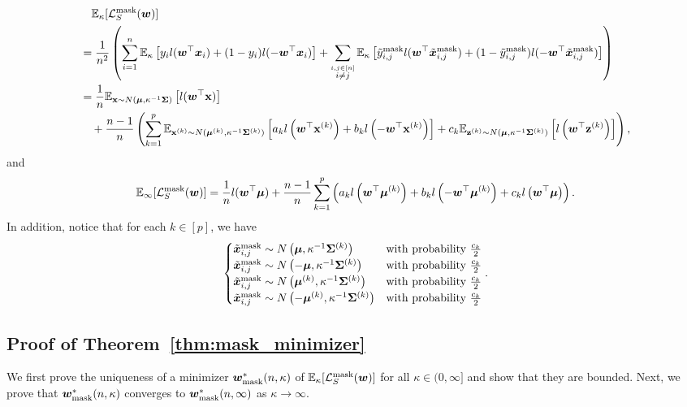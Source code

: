 \begin{align}\label{eqn:mask}
    &\quad \mathbb{E}_\kappa [\lossmask(\vw)]\nonumber \\
    &= \frac{1}{n^2} \left( \sum_{i=1}^n \mathbb{E}_\kappa \left[y_il(\vw^\top \vx_i) + (1-y_i) l(-\vw^\top \vx_i)\right]  + \sum_{\overset{i,j \in [n]}{i \neq j}} \mathbb{E}_\kappa \left[\tilde{y}_{i,j}^\mathrm{mask} l(\vw^\top \tilde{\vx}_{i,j}^\mathrm{mask}) + (1-\tilde{y}_{i,j}^\mathrm{mask}) l(-\vw^\top \tilde{\vx}_{i,j}^\mathrm{mask})\right]\right)\nonumber \\ 
    &=\frac{1}{n}\mathbb{E}_{\rvx \sim N(\vmu, \kappa^{-1} \mSigma)} \left[l(\vw^\top \rvx)\right] \nonumber \\
    &\quad + \frac{n-1}{n} \left( \sum_{k=1}^p \mathbb{E}_{\rvx^{(k)} \sim N(\vmu^{(k)}, \kappa^{-1}\mSigma^{(k)})}\left [a_k l\left (\vw^\top \rvx^{(k)}\right) +  b_k l \left(-\vw^\top \rvx^{(k)} \right) \right] + c_k \mathbb{E}_{\rvz^{(k)} \sim N(\vmu, \kappa^{-1} \mSigma^{(k)})}\left[l\left( \vw^\top \rvz^{(k)}\right)\right]\right),
\end{align}
and
\begin{equation}\label{eqn:mask_infty}
    \mathbb{E}_\infty[\lossmask (\vw)] = \frac{1}{n} l(\vw^\top \vmu) + \frac{n-1}{n}\sum_{k=1}^p \left(a_k l\left (\vw^\top \vmu^{(k)}\right) + b_k l\left (- \vw^\top \vmu^{(k)}\right) + c_k l\left (\vw^\top \vmu\right) \right).
\end{equation}
In addition, notice that for each $k \in [p]$, we have
\begin{align}\label{eqn:mask_dist}
\begin{cases}
\tilde{\vx}_{i,j}^\mathrm{mask} \sim N \left (\vmu, \kappa^{-1} \mSigma^{(k)} \right) &\text{with probability $\frac{c_k}{2}$}\\
\tilde{\vx}_{i,j}^\mathrm{mask} \sim N \left (-\vmu, \kappa^{-1} \mSigma^{(k)} \right) &\text{with probability $\frac{c_k}{2}$}\\
\tilde{\vx}_{i,j}^\mathrm{mask} \sim N \left (\vmu^{(k)}, \kappa^{-1} \mSigma^{(k)} \right) &\text{with probability $\frac{c_k}{2}$}\\
\tilde{\vx}_{i,j}^\mathrm{mask} \sim N \left (-\vmu^{(k)}, \kappa^{-1} \mSigma^{(k)} \right) &\text{with probability $\frac{c_k}{2}$}
\end{cases}.
\end{align}

\subsection{Proof of Theorem~\ref{thm:mask_minimizer}}\label{proof:mask}
We first prove the uniqueness of a minimizer $\wmask$ of $\mathbb{E}_\kappa [\lossmask(\vw)]$ for all $\kappa \in (0, \infty]$ and show that they are bounded. Next, we prove that $\wmask$ converges to $\wmask[\infty]$ as $\kappa \rightarrow \infty$.
